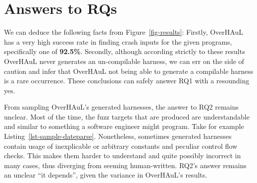 \documentclass[
  a4paper,
]{scrreprt}
\theoremstyle{definition}
\theoremstyle{remark}
\begin{document}
\section{Answers to RQs}\label{answers-to-rqs}

We can deduce the following facts from Figure~\ref{fig-results}:
Firstly, OverHAuL has a very high success rate in finding crash inputs
for the given programs, specifically one of \textbf{92.5\%}. Secondly,
although according strictly to these results OverHAuL never generates an
un-compilable harness, we can err on the side of caution and infer that
OverHAuL not being able to generate a compilable harness is a rare
occurrence. These conclusions can safely answer RQ1 with a resounding
yes.

From sampling OverHAuL's generated harnesses, the answer to RQ2 remains
unclear. Most of the time, the fuzz targets that are produced are
understandable and similar to something a software engineer might
program. Take for example Listing~\ref{lst-sample-dateparse}.
Nonetheless, sometimes generated harnesses contain usage of inexplicable
or arbitrary constants and peculiar control flow checks. This makes them
harder to understand and quite possibly incorrect in many cases, thus
diverging from seeming human-written. RQ2's answer remains an unclear
``it depends'', given the variance in OverHAuL's results.
\end{document}
